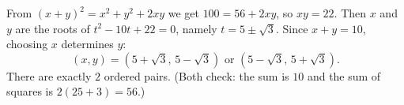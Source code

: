 From $(x+y)^2=x^2+y^2+2xy$ we get $100=56+2xy$, so $xy=22$. Then $x$ and $y$ are the roots of $t^2-10t+22=0$, namely $t=5\pm\sqrt3$. Since $x+y=10$, choosing $x$ determines $y$:
\[\boxed{(x,y)=\left(5+\sqrt3,\,5-\sqrt3\right)\text{ or }\left(5-\sqrt3,\,5+\sqrt3\right)}.\]
There are exactly $\boxed{2}$ ordered pairs. (Both check: the sum is $10$ and the sum of squares is $2\left(25+3\right)=56$.)
